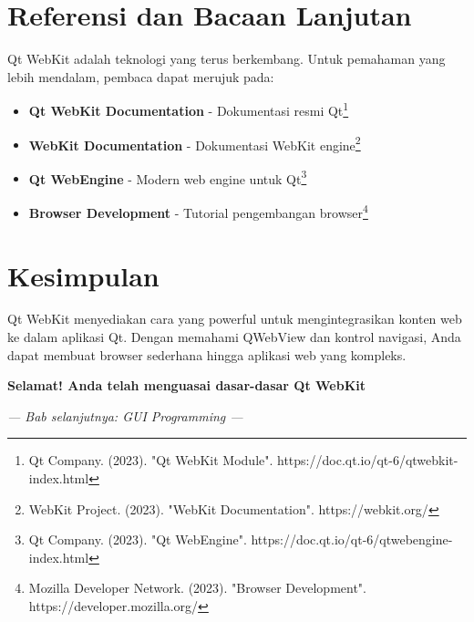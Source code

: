 \section{Referensi dan Bacaan Lanjutan}

Qt WebKit adalah teknologi yang terus berkembang. Untuk pemahaman yang lebih mendalam, pembaca dapat merujuk pada:

\begin{itemize}
\item \textbf{Qt WebKit Documentation} - Dokumentasi resmi Qt\footnote{Qt Company. (2023). "Qt WebKit Module". https://doc.qt.io/qt-6/qtwebkit-index.html}
\item \textbf{WebKit Documentation} - Dokumentasi WebKit engine\footnote{WebKit Project. (2023). "WebKit Documentation". https://webkit.org/}
\item \textbf{Qt WebEngine} - Modern web engine untuk Qt\footnote{Qt Company. (2023). "Qt WebEngine". https://doc.qt.io/qt-6/qtwebengine-index.html}
\item \textbf{Browser Development} - Tutorial pengembangan browser\footnote{Mozilla Developer Network. (2023). "Browser Development". https://developer.mozilla.org/}
\end{itemize}

\section{Kesimpulan}

Qt WebKit menyediakan cara yang powerful untuk mengintegrasikan konten web ke dalam aplikasi Qt. Dengan memahami QWebView dan kontrol navigasi, Anda dapat membuat browser sederhana hingga aplikasi web yang kompleks.

\begin{center}
\textbf{Selamat! Anda telah menguasai dasar-dasar Qt WebKit}
\end{center}

\vspace{1cm}

\begin{center}
\textit{--- Bab selanjutnya: GUI Programming ---}
\end{center}
